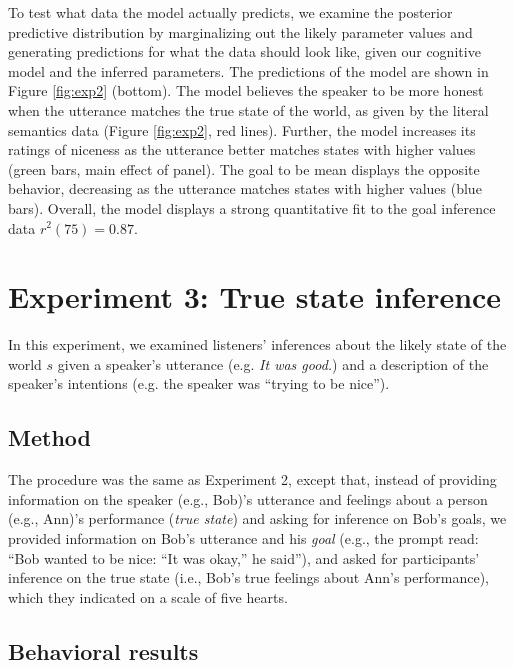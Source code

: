 \documentclass[10pt,letterpaper]{article}
\begin{document}
To test what data the model actually predicts, we examine the posterior predictive distribution by marginalizing out the likely parameter values and generating predictions for what the data should look like, given our cognitive model and the inferred parameters.
The predictions of the model are shown in Figure \ref{fig:exp2} (bottom).
The model believes the speaker to be more honest when the utterance matches the true state of the world, as given by the literal semantics data (Figure \ref{fig:exp2}, red lines). 
Further, the model increases its ratings of niceness as the utterance better matches states with higher values (green bars, main effect of panel).
The goal to be mean displays the opposite behavior, decreasing as the utterance matches states with higher values (blue bars).
Overall, the model displays a strong quantitative fit to the goal inference data $r^2(75) = 0.87$.

\section{Experiment 3: True state inference}

In this experiment, we examined listeners' inferences about the likely state of the world $s$ given a speaker's utterance (e.g. \emph{It was good.}) and a description of the speaker's intentions (e.g. the speaker was ``trying to be nice'').

\subsection{Method}

The procedure was the same as Experiment 2, except that, instead of providing information on the speaker (e.g., Bob)'s utterance and feelings about a person (e.g., Ann)'s performance (\emph{true state}) and asking for inference on Bob's goals, we provided information on Bob's utterance and his \emph{goal} (e.g., the prompt read: ``Bob wanted to be nice: ``It was okay,'' he said''), and asked for participants' inference on the true state (i.e., Bob's true feelings about Ann's performance), which they indicated on a scale of five hearts.

\subsection{Behavioral results}
\end{document}
